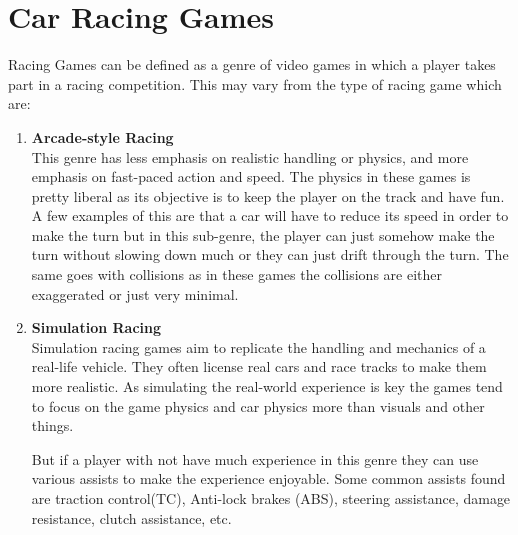 \section{Car Racing Games}
Racing Games can be defined as a genre of video games in which a player takes part in a racing competition. This may vary from the type of racing game which are:
\begin{enumerate}
    \item \textbf{Arcade-style Racing} \\
	This genre has less emphasis on realistic handling or physics, and more emphasis on fast-paced action and speed. The physics in these games is pretty liberal as its objective is to keep the player on the track and have fun. A few examples of this are that a car will have to reduce its speed in order to make the turn but in this sub-genre, the player can just somehow make the turn without slowing down much or they can just drift through the turn. The same goes with collisions as in these games the collisions are either exaggerated or just very minimal.
	

    \item \textbf{Simulation Racing} \\ 
    Simulation racing games aim to replicate the handling and mechanics of a real-life vehicle. They often license real cars and race tracks to make them more realistic. As simulating the real-world experience is key the games tend to focus on the game physics and car physics more than visuals and other things. 

	But if a player with not have much experience in this genre they can use various assists to make the experience enjoyable. Some common assists found are traction control(TC), Anti-lock brakes (ABS), steering assistance, damage resistance, clutch assistance, etc.


\end{enumerate}
